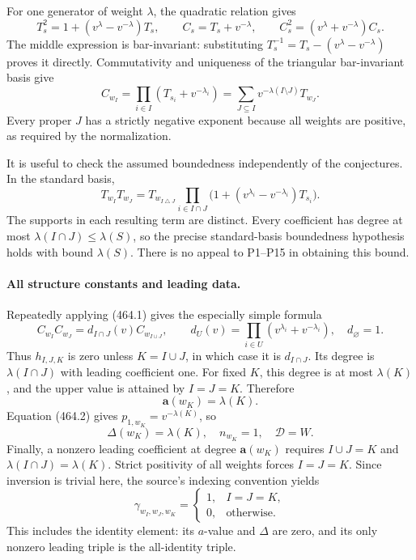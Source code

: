 \documentclass[11pt]{article}
\begin{document}
For one generator of weight $\lambda$, the quadratic relation gives
\[
 T_s^2=1+(v^\lambda-v^{-\lambda})T_s,
 \qquad C_s=T_s+v^{-\lambda},
 \qquad C_s^2=(v^\lambda+v^{-\lambda})C_s.
 \tag{464.1}
\]
The middle expression is bar-invariant: substituting
$T_s^{-1}=T_s-(v^\lambda-v^{-\lambda})$ proves it directly.
Commutativity and uniqueness of the triangular bar-invariant basis give
\[
 C_{w_I}=\prod_{i\in I}(T_{s_i}+v^{-\lambda_i})
       =\sum_{J\subseteq I}v^{-\lambda(I\setminus J)}T_{w_J}.
 \tag{464.2}
\]
Every proper $J$ has a strictly negative exponent because all weights
are positive, as required by the normalization.

It is useful to check the assumed boundedness independently of the
conjectures. In the standard basis,
\[
 T_{w_I}T_{w_J}
 =T_{w_{I\mathbin\triangle J}}
   \prod_{i\in I\cap J}\bigl(1+(v^{\lambda_i}-v^{-\lambda_i})T_{s_i}\bigr).
\]
The supports in each resulting term are distinct. Every coefficient
has degree at most $\lambda(I\cap J)\leq\lambda(S)$, so the
precise standard-basis boundedness hypothesis holds with bound
$\lambda(S)$. There is no appeal to P1--P15 in obtaining this bound.

\paragraph{All structure constants and leading data.}
Repeatedly applying (464.1) gives the especially simple formula
\[
 C_{w_I}C_{w_J}
   =d_{I\cap J}(v)C_{w_{I\cup J}},\qquad
 d_U(v)=\prod_{i\in U}(v^{\lambda_i}+v^{-\lambda_i}),\quad d_\varnothing=1.
 \tag{464.3}
\]
Thus $h_{I,J,K}$ is zero unless $K=I\cup J$, in which case it is
$d_{I\cap J}$. Its degree is $\lambda(I\cap J)$ with leading
coefficient one. For fixed $K$, this degree is at most $\lambda(K)$,
and the upper value is attained by $I=J=K$. Therefore
\[
 \mathbf a(w_K)=\lambda(K).
 \tag{464.4}
\]
Equation (464.2) gives $p_{1,w_K}=v^{-\lambda(K)}$, so
\[
 \Delta(w_K)=\lambda(K),\quad n_{w_K}=1,\quad\mathcal D=W.
 \tag{464.5}
\]
Finally, a nonzero leading coefficient at degree $\mathbf a(w_K)$
requires $I\cup J=K$ and $\lambda(I\cap J)=\lambda(K)$.
Strict positivity of all weights forces $I=J=K$. Since inversion is
trivial here, the source's indexing convention yields
\[
 \gamma_{w_I,w_J,w_K}=
 \begin{cases}1,&I=J=K,\\0,&\text{otherwise}.\end{cases}
 \tag{464.6}
\]
This includes the identity element: its $a$-value and $\Delta$ are
zero, and its only nonzero leading triple is the all-identity triple.
\end{document}

